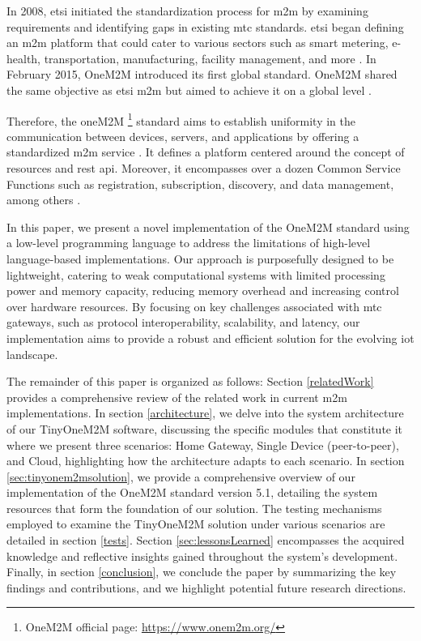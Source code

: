 \documentclass[a4paper,fleqn]{cas-dc}
\begin{document}
In 2008, \gls{etsi} initiated the standardization process for \gls{m2m} by examining requirements and identifying gaps in existing \gls{mtc} standards. \gls{etsi} began defining an \gls{m2m} platform that could cater to various sectors such as smart metering, e-health, transportation, manufacturing, facility management, and more \cite{7574435}. In February 2015, OneM2M introduced its first global standard. OneM2M shared the same objective as \gls{etsi} \gls{m2m} but aimed to achieve it on a global level \cite{pticek_architecture_2015}. 

Therefore, the oneM2M \footnote{OneM2M official page: \url{https://www.onem2m.org/}} standard aims to establish uniformity in the communication between devices, servers, and applications by offering a standardized \gls{m2m} service \cite{M2M2015}. It defines a platform centered around the concept of resources and \gls{rest} \gls{api}. Moreover, it encompasses over a dozen Common Service Functions such as registration, subscription, discovery, and data management, among others \cite{onem2m_standard}.

In this paper, we present a novel implementation of the OneM2M standard using a low-level programming language to address the limitations of high-level language-based implementations. Our approach is purposefully designed to be lightweight, catering to weak computational systems with limited processing power and memory capacity, reducing memory overhead and increasing control over hardware resources. By focusing on key challenges associated with \gls{mtc} gateways, such as protocol interoperability, scalability, and latency, our implementation aims to provide a robust and efficient solution for the evolving \gls{iot} landscape.

The remainder of this paper is organized as follows: Section \ref{relatedWork} provides a comprehensive review of the related work in current \gls{m2m} implementations. In section \ref{architecture}, we delve into the system architecture of our TinyOneM2M software, discussing the specific modules that constitute it where we present three scenarios: Home Gateway, Single Device (peer-to-peer), and Cloud, highlighting how the architecture adapts to each scenario. In section \ref{sec:tinyonem2msolution}, we provide a comprehensive overview of our implementation of the OneM2M standard version 5.1, detailing the system resources that form the foundation of our solution. The testing mechanisms employed to examine the TinyOneM2M solution under various scenarios are detailed in section \ref{tests}. Section \ref{sec:lessonsLearned} encompasses the acquired knowledge and reflective insights gained throughout the system's development. Finally, in section \ref{conclusion}, we conclude the paper by summarizing the key findings and contributions, and we highlight potential future research directions.
\end{document}
